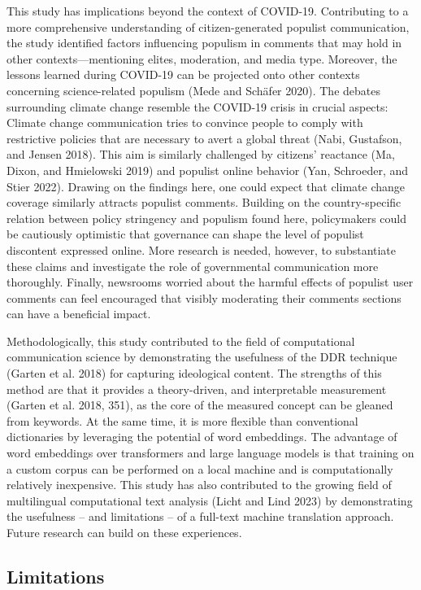 \documentclass[
]{ccr}
\begin{document}
This study has implications beyond the context of COVID-19. Contributing
to a more comprehensive understanding of citizen-generated populist
communication, the study identified factors influencing populism in
comments that may hold in other contexts---mentioning elites,
moderation, and media type. Moreover, the lessons learned during
COVID-19 can be projected onto other contexts concerning science-related
populism (Mede and Schäfer 2020). The debates surrounding climate change
resemble the COVID-19 crisis in crucial aspects: Climate change
communication tries to convince people to comply with restrictive
policies that are necessary to avert a global threat (Nabi, Gustafson,
and Jensen 2018). This aim is similarly challenged by citizens'
reactance (Ma, Dixon, and Hmielowski 2019) and populist online behavior
(Yan, Schroeder, and Stier 2022). Drawing on the findings here, one
could expect that climate change coverage similarly attracts populist
comments. Building on the country-specific relation between policy
stringency and populism found here, policymakers could be cautiously
optimistic that governance can shape the level of populist discontent
expressed online. More research is needed, however, to substantiate
these claims and investigate the role of governmental communication more
thoroughly. Finally, newsrooms worried about the harmful effects of
populist user comments can feel encouraged that visibly moderating their
comments sections can have a beneficial impact.

Methodologically, this study contributed to the field of computational
communication science by demonstrating the usefulness of the DDR
technique (Garten et al. 2018) for capturing ideological content. The
strengths of this method are that it provides a theory-driven, and
interpretable measurement (Garten et al. 2018, 351), as the core of the
measured concept can be gleaned from keywords. At the same time, it is
more flexible than conventional dictionaries by leveraging the potential
of word embeddings. The advantage of word embeddings over transformers
and large language models is that training on a custom corpus can be
performed on a local machine and is computationally relatively
inexpensive. This study has also contributed to the growing field of
multilingual computational text analysis (Licht and Lind 2023) by
demonstrating the usefulness -- and limitations -- of a full-text
machine translation approach. Future research can build on these
experiences.

\hypertarget{limitations}{%
\subsection{Limitations}\label{limitations}}
\end{document}

